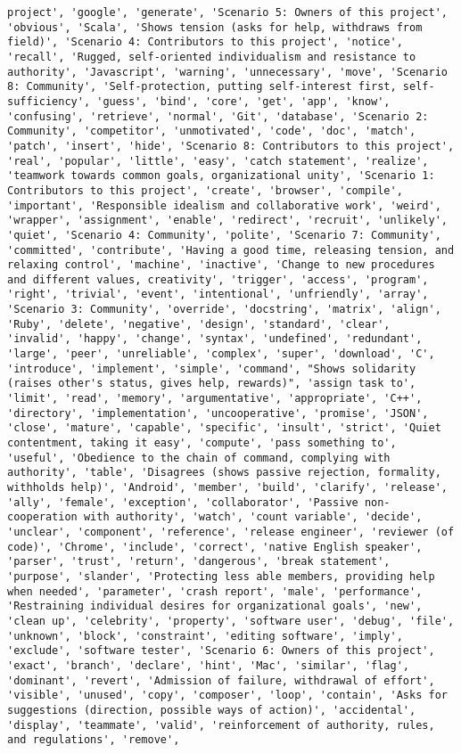 \documentclass[11pt]{article}
\begin{document}
\begin{Verbatim}[commandchars=\\\{\}]
project', 'google', 'generate', 'Scenario 5: Owners of this project', 'obvious', 'Scala', 'Shows tension (asks for help, withdraws from field)', 'Scenario 4: Contributors to this project', 'notice', 'recall', 'Rugged, self-oriented individualism and resistance to authority', 'Javascript', 'warning', 'unnecessary', 'move', 'Scenario 8: Community', 'Self-protection, putting self-interest first, self-sufficiency', 'guess', 'bind', 'core', 'get', 'app', 'know', 'confusing', 'retrieve', 'normal', 'Git', 'database', 'Scenario 2: Community', 'competitor', 'unmotivated', 'code', 'doc', 'match', 'patch', 'insert', 'hide', 'Scenario 8: Contributors to this project', 'real', 'popular', 'little', 'easy', 'catch statement', 'realize', 'teamwork towards common goals, organizational unity', 'Scenario 1: Contributors to this project', 'create', 'browser', 'compile', 'important', 'Responsible idealism and collaborative work', 'weird', 'wrapper', 'assignment', 'enable', 'redirect', 'recruit', 'unlikely', 'quiet', 'Scenario 4: Community', 'polite', 'Scenario 7: Community', 'committed', 'contribute', 'Having a good time, releasing tension, and relaxing control', 'machine', 'inactive', 'Change to new procedures and different values, creativity', 'trigger', 'access', 'program', 'right', 'trivial', 'event', 'intentional', 'unfriendly', 'array', 'Scenario 3: Community', 'override', 'docstring', 'matrix', 'align', 'Ruby', 'delete', 'negative', 'design', 'standard', 'clear', 'invalid', 'happy', 'change', 'syntax', 'undefined', 'redundant', 'large', 'peer', 'unreliable', 'complex', 'super', 'download', 'C', 'introduce', 'implement', 'simple', 'command', "Shows solidarity (raises other's status, gives help, rewards)", 'assign task to', 'limit', 'read', 'memory', 'argumentative', 'appropriate', 'C++', 'directory', 'implementation', 'uncooperative', 'promise', 'JSON', 'close', 'mature', 'capable', 'specific', 'insult', 'strict', 'Quiet contentment, taking it easy', 'compute', 'pass something to', 'useful', 'Obedience to the chain of command, complying with authority', 'table', 'Disagrees (shows passive rejection, formality, withholds help)', 'Android', 'member', 'build', 'clarify', 'release', 'ally', 'female', 'exception', 'collaborator', 'Passive non-cooperation with authority', 'watch', 'count variable', 'decide', 'unclear', 'component', 'reference', 'release engineer', 'reviewer (of code)', 'Chrome', 'include', 'correct', 'native English speaker', 'parser', 'trust', 'return', 'dangerous', 'break statement', 'purpose', 'slander', 'Protecting less able members, providing help when needed', 'parameter', 'crash report', 'male', 'performance', 'Restraining individual desires for organizational goals', 'new', 'clean up', 'celebrity', 'property', 'software user', 'debug', 'file', 'unknown', 'block', 'constraint', 'editing software', 'imply', 'exclude', 'software tester', 'Scenario 6: Owners of this project', 'exact', 'branch', 'declare', 'hint', 'Mac', 'similar', 'flag', 'dominant', 'revert', 'Admission of failure, withdrawal of effort', 'visible', 'unused', 'copy', 'composer', 'loop', 'contain', 'Asks for suggestions (direction, possible ways of action)', 'accidental', 'display', 'teammate', 'valid', 'reinforcement of authority, rules, and regulations', 'remove', 
\end{Verbatim}
\end{document}
